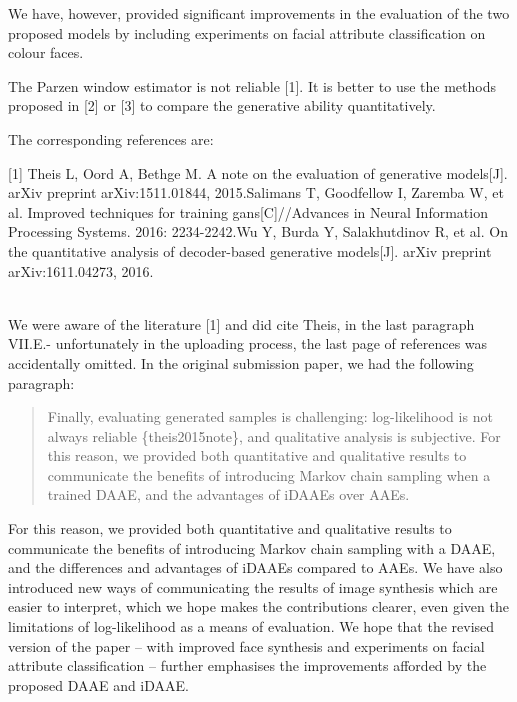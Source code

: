 \documentclass{article}
\begin{document}
We have, however, provided significant improvements in the evaluation of the two proposed models by including experiments on facial attribute classification on colour faces.


{\color{blue}
The Parzen window estimator is not reliable [1]. It is better to use the methods proposed in [2] or [3] to compare the generative ability quantitatively.

The corresponding references are:

[1] Theis L, Oord A, Bethge M. A note on the evaluation of generative models[J]. arXiv preprint arXiv:1511.01844, 2015.\newline
[2] Salimans T, Goodfellow I, Zaremba W, et al. Improved techniques for training gans[C]//Advances in Neural Information Processing Systems. 2016: 2234-2242.\newline
[3] Wu Y, Burda Y, Salakhutdinov R, et al. On the quantitative analysis of decoder-based generative models[J]. arXiv preprint arXiv:1611.04273, 2016.\newline
}
\\

We were aware of the literature [1] and did cite Theis, in the last paragraph VII.E.- unfortunately in the uploading process, the last page of references was accidentally omitted. In the original submission paper, we had the following paragraph:

\begin{quote} Finally, evaluating generated samples is challenging: log-likelihood is not always reliable \{theis2015note\}, and qualitative analysis is subjective. For this reason, we provided both quantitative and qualitative results to communicate the benefits of introducing Markov chain sampling when a trained DAAE, and the advantages of iDAAEs over AAEs. 
\end{quote}

For this reason, we provided both quantitative and qualitative results to communicate the benefits of introducing Markov chain sampling with a DAAE, and the differences and advantages of iDAAEs compared to AAEs. We have also introduced new ways of communicating the results of image synthesis which are easier to interpret, which we hope makes the contributions clearer, even given the limitations of log-likelihood as a means of evaluation. We hope that the revised version of the paper -- with improved face synthesis and experiments on facial attribute classification -- further emphasises the improvements afforded by the proposed DAAE and iDAAE.\\
\end{document}
